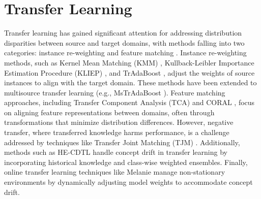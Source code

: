 \section{Transfer Learning} 
\label{sec:3_5_transfer_learning}
Transfer learning has gained significant attention for addressing distribution disparities between source and target domains, with methods falling into two categories: instance re-weighting and feature matching \cite{long2013transfer}. Instance re-weighting methods, such as Kernel Mean Matching (KMM) \cite{long2014transfer}, Kullback-Leibler Importance Estimation Procedure (KLIEP) \cite{sun2011two}, and TrAdaBoost \cite{freund1996experiments}, adjust the weights of source instances to align with the target domain. These methods have been extended to multisource transfer learning (e.g., MsTrAdaBoost \cite{sun2016return}). Feature matching approaches, including Transfer Component Analysis (TCA) \cite{sun2016return} and CORAL \cite{rahman2020correlation}, focus on aligning feature representations between domains, often through transformations that minimize distribution differences. However, negative transfer, where transferred knowledge harms performance, is a challenge addressed by techniques like Transfer Joint Matching (TJM) \cite{zhong2009cross}. Additionally, methods such as HE-CDTL \cite{powers2020evaluation} handle concept drift in transfer learning by incorporating historical knowledge and class-wise weighted ensembles. Finally, online transfer learning techniques like Melanie \cite{sun2016return} manage non-stationary environments by dynamically adjusting model weights to accommodate concept drift.

